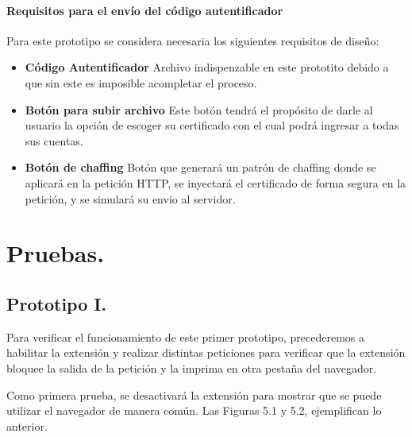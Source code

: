 \documentclass[12pt, a4paper, titlepage]{report}
\begin{document}
    			     \subsubsection{Requisitos para el envío del código autentificador}   
    			        Para este prototipo se considera necesaria los siguientes requisitos de diseño:
    			        \begin{itemize}
    			            \item \textbf{Código Autentificador} Archivo indispenzable en este prototito debido a que sin este es imposible acompletar el proceso.
    
    			            \item \textbf{Botón para subir archivo} Este botón tendrá el propósito de darle al usuario la opción de escoger su certificado con el cual podrá ingresar a todas sus cuentas.
    			            
    			            \item \textbf{Botón de chaffing} Botón que generará un patrón de chaffing donde se aplicará en la petición HTTP, se inyectará el certificado de forma segura en la petición, y se simulará su envio al servidor.
    			           
    			        \end{itemize}
			        
    \chapter{\textcolor{azulescom}{Pruebas.}}
        \section{Prototipo I.}
            Para verificar el funcionamiento de este primer prototipo, precederemos a habilitar la extensión y realizar distintas peticiones para verificar que la extensión bloquee la salida de la petición y la imprima en otra pestaña del navegador.
            
            Como primera prueba, se desactivará la extensión para mostrar que se puede utilizar el navegador de manera común. Las Figuras 5.1 y 5.2, ejemplifican lo anterior.
            
\end{document}
